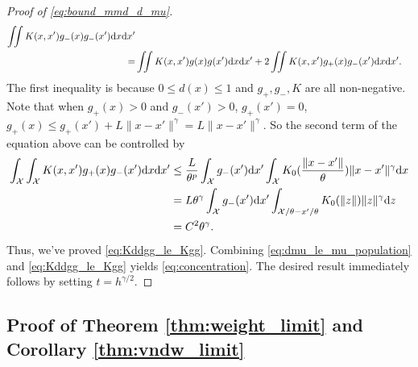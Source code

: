 \documentclass[12pt]{article}
\newcommand{\prob}{\mathbb{P}}
\begin{document}
\begin{proof}[Proof of \eqref{eq:bound_mmd_d_mu}]
\begin{align*}
		\iint K(x, x') g_-(x) g_-(x') \textnormal{d} x \textnormal{d} x'
		\\ = &
		\iint K(x, x') g(x) g(x') \textnormal{d} x \textnormal{d} x' + 
		2 \iint K(x, x') g_+(x) g_-(x') \textnormal{d} x \textnormal{d} x'
		.\end{align*}
	The first inequality is because $0 \le d(x) \le 1$ and $g_+, g_-, K$ are all non-negative. Note that when $g_+(x) > 0$ and $g_-(x') > 0$, $g_+(x') = 0$, $g_+(x) \le g_+(x') + L \|x-x'\|^\gamma = L \|x-x'\|^\gamma$. So the second term of the equation above can be controlled by
	\begin{align*}
		\int_\mathcal{X} \int_\mathcal{X} K(x, x') g_+(x) g_-(x') \textnormal{d} x \textnormal{d} x'
		&\le
		\frac{L}{\theta^p} \int_\mathcal{X} g_-(x') \textnormal{d} x'
		\int_\mathcal{X} K_0(\frac{\|x-x'\|}{\theta}) \|x-x'\|^{\gamma} \textnormal{d} x
		\\&=
		L \theta^\gamma \int_\mathcal{X} g_-(x')\textnormal{d} x' \int_{\mathcal{X}/\theta - x'/\theta} K_0(\|z\|) \|z\|^\gamma \textnormal{d} z
		\\&=
		C^2 \theta^{\gamma}
		.\end{align*}
	Thus, we've proved \eqref{eq:Kddgg_le_Kgg}. Combining \eqref{eq:dmu_le_mu_population} and \eqref{eq:Kddgg_le_Kgg} yields \eqref{eq:concentration}. The desired result immediately follows by setting $t = h^{\gamma/2}$.
\end{proof}



\subsection{Proof of Theorem \ref{thm:weight_limit} and Corollary \ref{thm:vndw_limit}}
\end{document}
